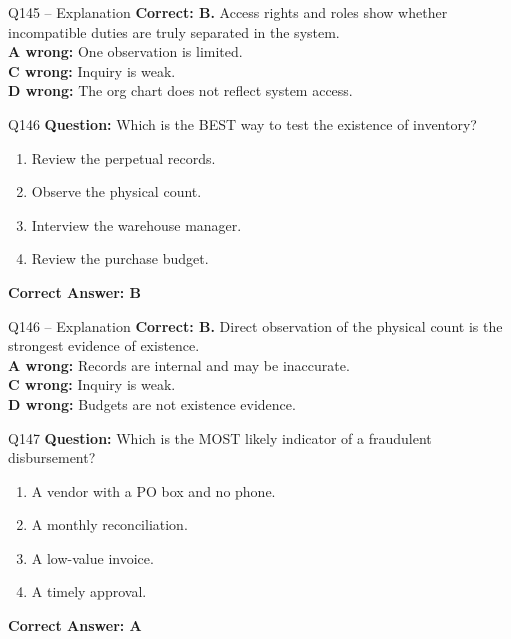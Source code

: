 \documentclass[aspectratio=169,10pt]{beamer}
\begin{document}
	\begin{frame}[t]{Q145 -- Explanation}
		\small
		\textbf{Correct: B.} Access rights and roles show whether incompatible duties are truly separated in the system. \\[4pt]
		\textbf{A wrong:} One observation is limited. \\[2pt]
		\textbf{C wrong:} Inquiry is weak. \\[2pt]
		\textbf{D wrong:} The org chart does not reflect system access.
	\end{frame}
	
	\begin{frame}[t]{Q146}
		\small
		\textbf{Question:} Which is the BEST way to test the existence of inventory?
		\begin{enumerate}[label=\Alph*.,itemsep=1pt,topsep=2pt]
			\item Review the perpetual records.
			\item Observe the physical count.
			\item Interview the warehouse manager.
			\item Review the purchase budget.
		\end{enumerate}
		\vspace{4pt}
		\textbf{Correct Answer: B}
	\end{frame}
	
	\begin{frame}[t]{Q146 -- Explanation}
		\small
		\textbf{Correct: B.} Direct observation of the physical count is the strongest evidence of existence. \\[4pt]
		\textbf{A wrong:} Records are internal and may be inaccurate. \\[2pt]
		\textbf{C wrong:} Inquiry is weak. \\[2pt]
		\textbf{D wrong:} Budgets are not existence evidence.
	\end{frame}
	
	\begin{frame}[t]{Q147}
		\small
		\textbf{Question:} Which is the MOST likely indicator of a fraudulent disbursement?
		\begin{enumerate}[label=\Alph*.,itemsep=1pt,topsep=2pt]
			\item A vendor with a PO box and no phone.
			\item A monthly reconciliation.
			\item A low-value invoice.
			\item A timely approval.
		\end{enumerate}
		\vspace{4pt}
		\textbf{Correct Answer: A}
	\end{frame}
	
\end{document}
